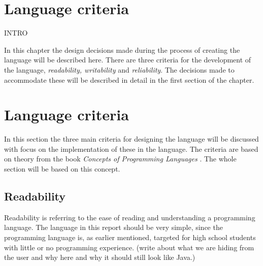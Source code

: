 \section{Language criteria}
INTRO

\label{chap:LanguageDesign}
In this chapter the design decisions made during the process of creating the language will be described here. There are three criteria for the development of the language, \emph{readability, writability} and \emph{reliability}. The decisions made to accommodate these will be described in detail in the first section of the chapter. 
 
\section{Language criteria}

In this section the three main criteria for designing the language will be discussed with focus on the implementation of these in the language. The criteria are based on theory from the book \emph{Concepts of Programming Languages} \citep{Sebesta}. The whole section will be based on this concept.

\subsection{Readability}
Readability is referring to the ease of reading and understanding a programming language. The language in this report should be very simple, since the programming language is, as earlier mentioned, targeted for high school students with little or no programming experience. (write about what we are hiding from  the user and why here and why it should still look like Java.)
\label{sec:MoSCoW}

